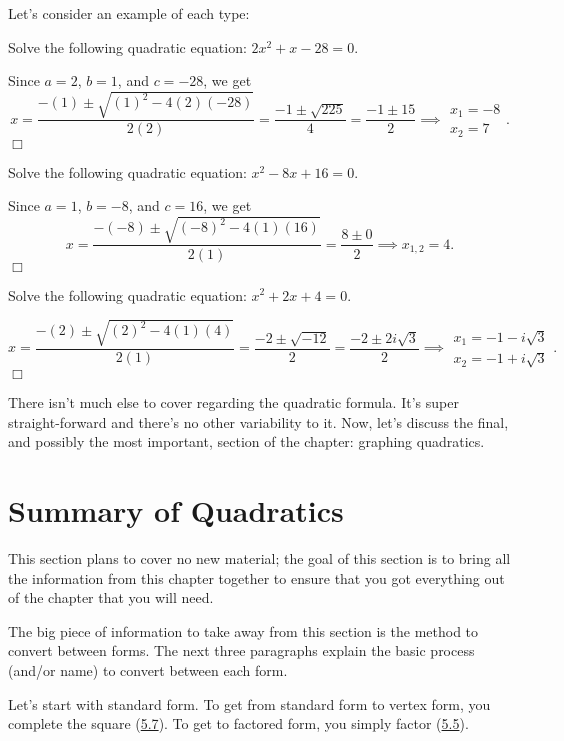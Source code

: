 \documentclass[lang=en,11pt]{elegantbook}
\begin{document}
Let's consider an example of each type:
\begin{example}
Solve the following quadratic equation: $2x^2+x-28=0$.
\end{example}
\begin{solution}
Since $a=2$, $b=1$, and $c=-28$, we get $$x=\frac{-(1)\pm\sqrt{(1)^2-4(2)(-28)}}{2(2)}=\frac{-1\pm\sqrt{225}}{4}=\frac{-1\pm 15}{2}\implies \begin{matrix} x_1=-8 \\ x_2=7 \end{matrix}.$$$\Box$
\end{solution}
\begin{example}
Solve the following quadratic equation: $x^2-8x+16=0$.
\end{example}
\begin{solution}
Since $a=1$, $b=-8$, and $c=16$, we get $$x=\frac{-(-8)\pm\sqrt{(-8)^2-4(1)(16)}}{2(1)}=\frac{8\pm 0}{2} \implies x_{1,2}=4.$$ $\Box$
\end{solution}
\begin{example}
Solve the following quadratic equation: $x^2+2x+4=0$.
\end{example}
\begin{solution}
$$x=\frac{-(2)\pm\sqrt{(2)^2-4(1)(4)}}{2(1)}=\frac{-2\pm\sqrt{-12}}{2}=\frac{-2\pm 2i\sqrt{3}}{2} \implies \begin{matrix} x_1=-1-i\sqrt{3} \\ x_2=-1+i\sqrt{3} \end{matrix}.$$ $\Box$
\end{solution}
\noindent There isn't much else to cover regarding the quadratic formula.  It's super straight-forward and there's no other variability to it.  Now, let's discuss the final, and possibly the most important, section of the chapter: graphing quadratics.
\section{Summary of Quadratics}
This section plans to cover no new material; the goal of this section is to bring all the information from this chapter together to ensure that you got everything out of the chapter that you will need.

The big piece of information to take away from this section is the method to convert between forms.  The next three paragraphs explain the basic process (and/or name) to convert between each form.

Let's start with standard form.  To get from standard form to vertex form, you complete the square (\hyperlink{section.5.7}{5.7}).  To get to factored form, you simply factor (\hyperlink{section.5.5}{5.5}).
\end{document}
